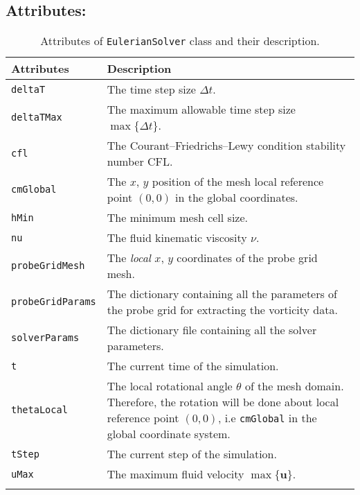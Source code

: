 \subsection*{Attributes:}
\begingroup
\footnotesize
\begin{longtable}{|l|p{12cm}|}
	\hline
	\textbf{Attributes} & \textbf{Description}\\
	\toprule
    \texttt{deltaT} 		& The time step size $\Delta t$. \\ \hline
    \texttt{deltaTMax} 		& The maximum allowable time step size $\max\{\Delta t\}$.\\ \hline
    \texttt{cfl} 			& The Courant–Friedrichs–Lewy condition stability number CFL. \\ \hline        
    \texttt{cmGlobal} 		& The $x$, $y$ position of the mesh local reference point $(0,0)$ in the global coordinates. \\ \hline        
    \texttt{hMin} 			& The minimum mesh cell size. \\ \hline        
    \texttt{nu} 			& The fluid kinematic viscosity $\nu$.  \\ \hline        
    \texttt{probeGridMesh} 	& The \textit{local} $x$, $y$ coordinates of the probe grid mesh. \\ \hline            
    \texttt{probeGridParams}& The dictionary containing all the parameters of the probe grid for extracting the vorticity data. \\ \hline            
    \texttt{solverParams} 	& The dictionary file containing all the solver parameters.  \\ \hline                
    \texttt{t} 				& The current time of the simulation. \\ \hline                    
    \texttt{thetaLocal} 	& The local rotational angle $\theta$ of the mesh domain. Therefore, the rotation will be done about local reference  point $(0,0)$, i.e \texttt{cmGlobal} in the global coordinate system.\\ \hline                            
    \texttt{tStep} 			& The current step of the simulation. \\ \hline                    
    \texttt{uMax} 			& The maximum fluid velocity $\max\{\mathbf{u}\}$. \\ \hline
    
    \caption{Attributes of \texttt{EulerianSolver} class and their description.}
    \label{tab:attributeEulerian}
\end{longtable}
\endgroup


